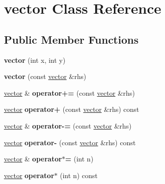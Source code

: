 \hypertarget{classvector}{}\section{vector Class Reference}
\label{classvector}
\subsection*{Public Member Functions}
\begin{DoxyCompactItemize}
\item 
\mbox{\label{classvector_a7fa147d3199381b9d8b32753bd1a6968}} 
{\bfseries vector} (int x, int y)
\item 
\mbox{\label{classvector_a829904aef4f1a78fc3c52ef7c857f8f4}} 
{\bfseries vector} (const \hyperlink{classvector}{vector} \&rhs)
\item 
\mbox{\label{classvector_acf4c6a4d343c92e211f80de7712a3cac}} 
\hyperlink{classvector}{vector} \& {\bfseries operator+=} (const \hyperlink{classvector}{vector} \&rhs)
\item 
\mbox{\label{classvector_a9d639bc53d77f17c6ba3af1dd9549424}} 
\hyperlink{classvector}{vector} {\bfseries operator+} (const \hyperlink{classvector}{vector} \&rhs) const
\item 
\mbox{\label{classvector_a9f6cf8d24ca60a5bec617c364172d89f}} 
\hyperlink{classvector}{vector} \& {\bfseries operator-\/=} (const \hyperlink{classvector}{vector} \&rhs)
\item 
\mbox{\label{classvector_a35999c3c2b222c116a4a8fca73cda8a9}} 
\hyperlink{classvector}{vector} {\bfseries operator-\/} (const \hyperlink{classvector}{vector} \&rhs) const
\item 
\mbox{\label{classvector_a6adc3766a4afa03340fa2a94d6d81a00}} 
\hyperlink{classvector}{vector} \& {\bfseries operator$\ast$=} (int n)
\item 
\mbox{\label{classvector_ae8268e89871c314722c37da956b0d386}} 
\hyperlink{classvector}{vector} {\bfseries operator$\ast$} (int n) const
\end{DoxyCompactItemize}
